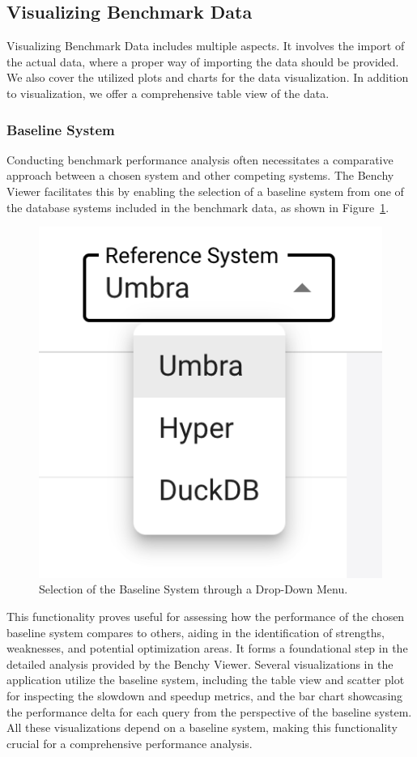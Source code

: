 \subsection{Visualizing Benchmark Data}
Visualizing Benchmark Data includes multiple aspects. It involves the import of the actual data, where a proper way of importing the data should be provided. We also cover the utilized plots and charts for the data visualization. In addition to visualization, we offer a comprehensive table view of the data.


\subsubsection{Baseline System}

Conducting benchmark performance analysis often necessitates a comparative approach between a chosen system and other competing systems. The Benchy Viewer facilitates this by enabling the selection of a baseline system from one of the database systems included in the benchmark data, as shown in Figure~\ref{fig:select-baseline-system}.

\begin{figure}[h]
  \centering
  \includegraphics[width=0.3\linewidth]{figures/select-baseline-system.png}
  \caption{Selection of the Baseline System through a Drop-Down Menu.}
  \label{fig:select-baseline-system}
\end{figure}


This functionality proves useful for assessing how the performance of the chosen baseline system compares to others, aiding in the identification of strengths, weaknesses, and potential optimization areas. It forms a foundational step in the detailed analysis provided by the Benchy Viewer. Several visualizations in the application utilize the baseline system, including the table view and scatter plot for inspecting the slowdown and speedup metrics, and the bar chart showcasing the performance delta for each query from the perspective of the baseline system. All these visualizations depend on a baseline system, making this functionality crucial for a comprehensive performance analysis.


